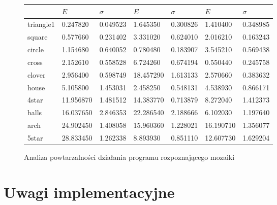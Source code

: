 \documentclass[a4paper,12pt,leqno]{article}
\begin{document}
\begin{figure}\centering
\footnotesize
\vspace{-1.2em}
\vspace{-1.2em}
\vspace{.5em}
\begin{tabular}{|l|ll|ll|ll|}\hline
          & $E$       & $\sigma$ & $E$       & $\sigma$ & $E$       & $\sigma$ \\ \hline
triangle1 &  0.247820 & 0.049523 &  1.645350 & 0.300826 &  1.410400 & 0.348985 \\
square    &  0.577660 & 0.231402 &  3.331020 & 0.624010 &  2.016210 & 0.163243 \\
circle    &  1.154680 & 0.640052 &  0.780480 & 0.183907 &  3.545210 & 0.569438 \\
cross     &  2.152610 & 0.558528 &  6.724260 & 0.674194 &  0.550440 & 0.245758 \\
clover    &  2.956400 & 0.598749 & 18.457290 & 1.613133 &  2.570660 & 0.383632 \\
house     &  5.105800 & 1.453031 &  2.458250 & 0.548131 &  4.538930 & 0.866171 \\
4star     & 11.956870 & 1.481512 & 14.383770 & 0.713879 &  8.272040 & 1.412373 \\
balls     & 16.037650 & 2.846353 & 22.286540 & 2.188666 &  6.102030 & 1.197640 \\
arch      & 24.902450 & 1.408058 & 15.960360 & 1.228021 & 16.190710 & 1.356077 \\
5star     & 28.833450 & 1.262338 &  8.893930 & 0.851110 & 12.607730 & 1.629204 \\ \hline
\end{tabular}
\normalsize\caption{Analiza powtarzalności działania programu rozpoznającego mozaiki}\label{mosaic-results}
\end{figure}

\section{Uwagi implementacyjne}
\end{document}
